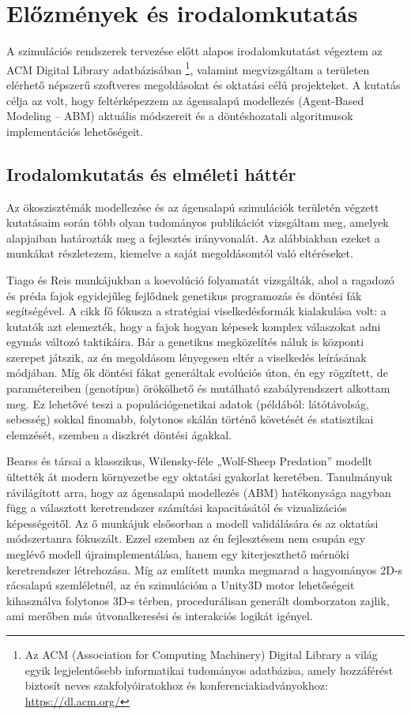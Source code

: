 \chapter{Előzmények és irodalomkutatás}
\label{chap:irodalom}

A szimulációs rendszerek tervezése előtt alapos irodalomkutatást végeztem az ACM Digital Library adatbázisában \footnote{Az ACM (Association for Computing Machinery) Digital Library a világ egyik legjelentősebb informatikai tudományos adatbázisa, amely hozzáférést biztosít neves szakfolyóiratokhoz és konferenciakiadványokhoz: \url{https://dl.acm.org/}}, valamint megvizsgáltam a területen elérhető népszerű szoftveres megoldásokat és oktatási célú projekteket. A kutatás célja az volt, hogy feltérképezzem az ágensalapú modellezés (Agent-Based Modeling – ABM) aktuális módszereit és a döntéshozatali algoritmusok implementációs lehetőségeit.

\section{Irodalomkutatás és elméleti háttér}

Az ökoszisztémák modellezése és az ágensalapú szimulációk területén végzett kutatásaim során több olyan tudományos publikációt vizsgáltam meg, amelyek alapjaiban határozták meg a fejlesztés irányvonalát. Az alábbiakban ezeket a munkákat részletezem, kiemelve a saját megoldásomtól való eltéréseket.

Tiago és Reis munkájukban \cite{Tiago08} a koevolúció folyamatát vizsgálták, ahol a ragadozó és préda fajok egyidejűleg fejlődnek genetikus programozás és döntési fák segítségével. A cikk fő fókusza a stratégiai viselkedésformák kialakulása volt: a kutatók azt elemezték, hogy a fajok hogyan képesek komplex válaszokat adni egymás változó taktikáira. Bár a genetikus megközelítés náluk is központi szerepet játszik, az én megoldásom lényegesen eltér a viselkedés leírásának módjában. Míg ők döntési fákat generáltak evolúciós úton, én egy rögzített, de paramétereiben (genotípus) örökölhető és mutálható szabályrendszert alkottam meg. Ez lehetővé teszi a populációgenetikai adatok (példából: látótávolság, sebesség) sokkal finomabb, folytonos skálán történő követését és statisztikai elemzését, szemben a diszkrét döntési ágakkal.

Bearss és társai \cite{Michael22} a klasszikus, Wilensky-féle „Wolf-Sheep Predation” modellt ültették át modern környezetbe egy oktatási gyakorlat keretében. Tanulmányuk rávilágított arra, hogy az ágensalapú modellezés (ABM) hatékonysága nagyban függ a választott keretrendszer számítási kapacitásától és vizualizációs képességeitől. Az ő munkájuk elsősorban a modell validálására és az oktatási módszertanra fókuszált. Ezzel szemben az én fejlesztésem nem csupán egy meglévő modell újraimplementálása, hanem egy kiterjeszthető mérnöki keretrendszer létrehozása. Míg az említett munka megmarad a hagyományos 2D-s rácsalapú szemléletnél, az én szimulációm a Unity3D motor lehetőségeit kihasználva folytonos 3D-s térben, procedurálisan generált domborzaton zajlik, ami merőben más útvonalkeresési és interakciós logikát igényel.

